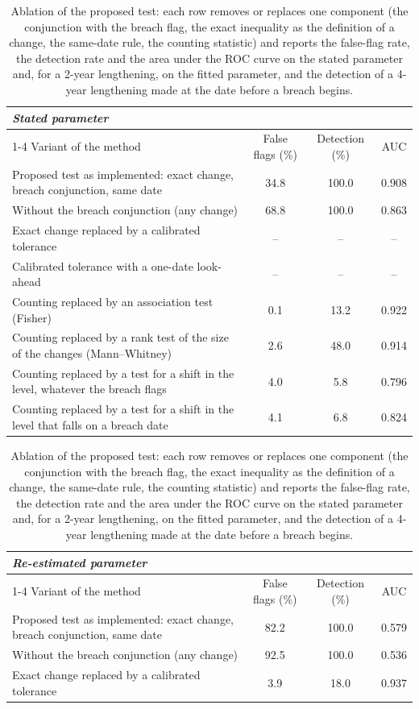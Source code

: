 \begin{table}[htbp]
\centering
\footnotesize
\caption{Ablation of the proposed test: each row removes or replaces one component (the conjunction with the breach flag, the exact inequality as the definition of a change, the same-date rule, the counting statistic) and reports the false-flag rate, the detection rate and the area under the ROC curve on the stated parameter and, for a 2-year lengthening, on the fitted parameter, and the detection of a 4-year lengthening made at the date before a breach begins.}
\label{tab:ablation}
\begin{tabular}{p{6.4cm}ccc}
\toprule
\multicolumn{4}{l}{\textit{Stated parameter}} \\
\cmidrule(lr){1-4}
Variant of the method & False flags (\%) & Detection (\%) & AUC \\
\midrule
Proposed test as implemented: exact change, breach conjunction, same date & 34.8 & 100.0 & 0.908 \\
Without the breach conjunction (any change) & 68.8 & 100.0 & 0.863 \\
Exact change replaced by a calibrated tolerance & -- & -- & -- \\
Calibrated tolerance with a one-date look-ahead & -- & -- & -- \\
Counting replaced by an association test (Fisher) & 0.1 & 13.2 & 0.922 \\
Counting replaced by a rank test of the size of the changes (Mann--Whitney) & 2.6 & 48.0 & 0.914 \\
Counting replaced by a test for a shift in the level, whatever the breach flags & 4.0 & 5.8 & 0.796 \\
Counting replaced by a test for a shift in the level that falls on a breach date & 4.1 & 6.8 & 0.824 \\
\bottomrule
\end{tabular}
\par\medskip
\begin{tabular}{p{6.4cm}ccc}
\toprule
\multicolumn{4}{l}{\textit{Re-estimated parameter}} \\
\cmidrule(lr){1-4}
Variant of the method & False flags (\%) & Detection (\%) & AUC \\
\midrule
Proposed test as implemented: exact change, breach conjunction, same date & 82.2 & 100.0 & 0.579 \\
Without the breach conjunction (any change) & 92.5 & 100.0 & 0.536 \\
Exact change replaced by a calibrated tolerance & 3.9 & 18.0 & 0.937 \\

\end{tabular}
\end{table}
